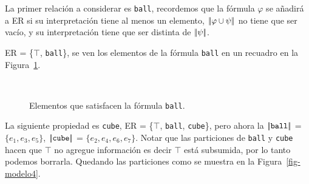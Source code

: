 La primer relaci\'on a considerar es \texttt{ball}, recordemos que la f\'ormula $\varphi$ se a\~nadir\'a a ER si su interpretaci\'on 
tiene al menos un elemento, $|\!|\varphi \cup \psi|\!|$ no tiene que ser vac\'io, y su interpretaci\'on tiene que ser distinta 
de $|\!|\psi|\!|$. 

ER = \{$\top$, \texttt{ball}\}, se ven los elementos de la f\'ormula \texttt{ball} en un recuadro en la Figura~\ref{fig-modelo3}.

\begin{figure}[ht]
\begin{center}
\\[0pt]
\caption{Elementos que satisfacen la f\'ormula \texttt{ball}.}
\label{fig-modelo3}
\end{center}
\end{figure}

La siguiente propiedad es \texttt{cube}, ER = \{$\top$, \texttt{ball}, \texttt{cube}\}, pero ahora la $|\!|\texttt{ball}|\!|$ = $\{e_1,e_3,e_5\}$, 
$|\!|\texttt{cube}|\!|$ = $\{e_2, e_4, e_6, e_7\}$. Notar que las particiones de  \texttt{ball} y \texttt{cube} hacen que $\top$ no agregue informaci\'on es decir $\top$ est\'a subsumida, por lo tanto podemos borrarla. Quedando las particiones como se muestra en la Figura~\ref{fig-modelo4}.

%

